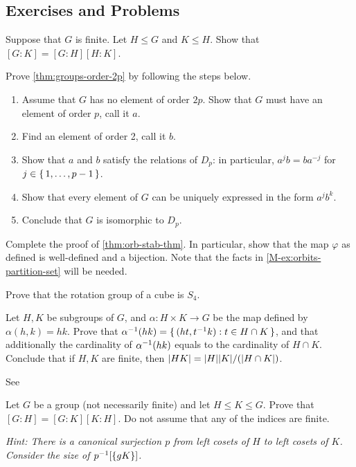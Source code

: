 \documentclass[./main.tex]{subfiles}
\begin{document}
\subsection{Exercises and Problems}

\begin{exercise}
    Suppose that $G$ is finite. Let $H \leq G$ and $K \leq H$. Show that $[G:K]
    = [G:H][H:K]$.
\end{exercise}

\begin{exercise}
\label{ex:prove-thm-classifying-order-2p}
    Prove \cref{thm:groups-order-2p} by following the steps below.
    \begin{enumerate}
        \item Assume that $G$ has no element of order $2p$. Show that $G$ must have an element of order $p$, call it $a$.
        \item Find an element of order 2, call it $b$.
        \item Show that $a$ and $b$ satisfy the relations of $D_p$: in particular, $a^j b = b a^{-j}$ for $j \in \set{1, \dots, p-1}$.
        \item Show that every element of $G$ can be uniquely expressed in the form $a^jb^k$. 
        \item Conclude that $G$ is isomorphic to $D_p$.
    \end{enumerate}
\end{exercise}

\begin{exercise}
\label{ex:orb-stab-thm}
Complete the proof of \cref{thm:orb-stab-thm}. In particular, show that the map
$\varphi$ as defined is well-defined and a bijection. Note that
the facts in \cref{M-ex:orbits-partition-set} will be needed.
\end{exercise}

\begin{exercise}
    Prove that the rotation group of a cube is $S_4$.
\end{exercise}

\begin{exercise}
\label{ex:generalization-of-hk-theorem}
    Let $H, K$ be subgroups of $G$, and $\alpha: H \times K \to G$ be the map
    defined by $\alpha(h, k) = hk$. Prove that $\alpha\inv \paren{hk} =
    \set{(ht, t\inv k): t \in H \cap K}$, and that additionally the cardinality
    of $\alpha\inv\paren{hk}$ equals to the cardinality of $H \cap K$. Conclude
    that if $H, K$ are finite, then $\abs{HK} = \abs H \abs K/(\abs{H \cap K})$.

    See \autocite[Exercise~9,\pno~58]{Jacobson_2009}
\end{exercise}


\begin{exercise}
    Let $G$ be a group (not necessarily finite) and let $H \leq K \leq G$. Prove
    that $[G:H] = [G:K][K:H]$. Do not assume that any of the indices are finite.

    \textit{Hint: There is a canonical surjection $p$ from left cosets of $H$ to
    left cosets of $K$. Consider the size of $p\inv\paren*{\{gK\}}$.}
\end{exercise}
\end{document}
